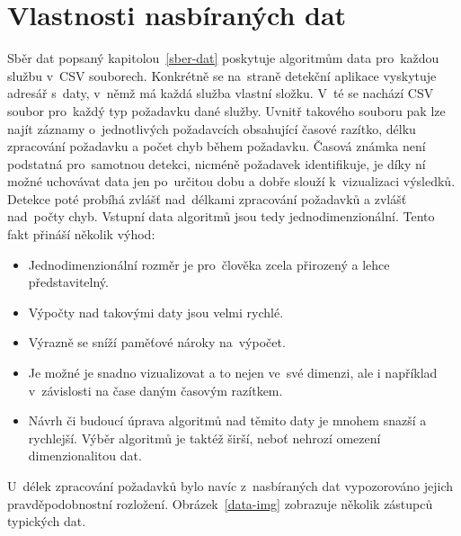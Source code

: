 \section{Vlastnosti nasbíraných dat}
\label{vlastnosti-nasbiranych-dat}
Sběr dat popsaný kapitolou~\ref{sber-dat} poskytuje algoritmům data pro~každou službu v~CSV souborech. Konkrétně se na~straně detekční aplikace vyskytuje adresář s~daty, v~němž má každá služba vlastní složku. V~té se nachází CSV soubor pro~každý typ požadavku dané služby. Uvnitř takového souboru pak lze najít záznamy o~jednotlivých požadavcích obsahující časové razítko, délku zpracování požadavku a počet chyb během požadavku. Časová známka není podstatná pro~samotnou detekci, nicméně požadavek identifikuje, je díky ní možné uchovávat data jen po~určitou dobu a dobře slouží k~vizualizaci výsledků. Detekce poté probíhá zvlášť nad~délkami zpracování požadavků a zvlášť nad~počty chyb. Vstupní data algoritmů jsou tedy jednodimenzionální. Tento fakt přináší několik výhod:

\begin{itemize}
    \item Jednodimenzionální rozměr je pro~člověka zcela přirozený a lehce představitelný.
    \item Výpočty nad takovými daty jsou velmi rychlé.
    \item Výrazně se sníží paměťové nároky na~výpočet.
    \item Je možné je snadno vizualizovat a to nejen ve~své dimenzi, ale i například v~závislosti na čase daným časovým razítkem.
    \item Návrh či budoucí úprava algoritmů nad těmito daty je mnohem snazší a rychlejší. Výběr algoritmů je taktéž širší, neboť nehrozí omezení dimenzionalitou dat.
\end{itemize}

U~délek zpracování požadavků bylo navíc z~nasbíraných dat vypozorováno jejich pravděpodobnostní rozložení. Obrázek~\ref{data-img} zobrazuje několik zástupců typických dat.

